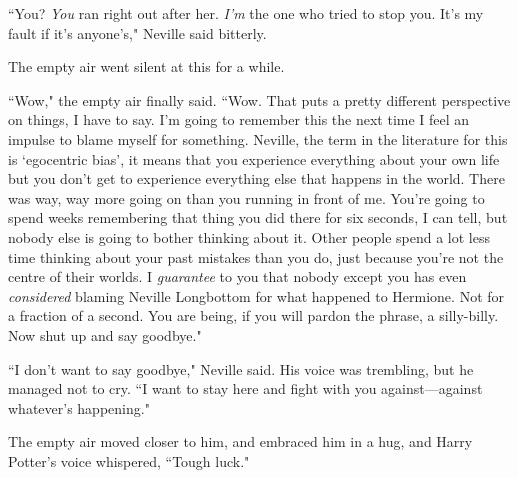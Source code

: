 ``You? \emph{You} ran right out after her. \emph{I'm} the one who tried to stop you. It's my fault if it's anyone's," Neville said bitterly.

The empty air went silent at this for a while.

``Wow," the empty air finally said. ``Wow. That puts a pretty different perspective on things, I have to say. I'm going to remember this the next time I feel an impulse to blame myself for something. Neville, the term in the literature for this is `egocentric bias', it means that you experience everything about your own life but you don't get to experience everything else that happens in the world. There was way, way more going on than you running in front of me. You're going to spend weeks remembering that thing you did there for six seconds, I can tell, but nobody else is going to bother thinking about it. Other people spend a lot less time thinking about your past mistakes than you do, just because you're not the centre of their worlds. I \emph{guarantee} to you that nobody except you has even \emph{considered} blaming Neville Longbottom for what happened to Hermione. Not for a fraction of a second. You are being, if you will pardon the phrase, a silly-billy. Now shut up and say goodbye."

``I don't want to say goodbye," Neville said. His voice was trembling, but he managed not to cry. ``I want to stay here and fight with you against—against whatever's happening."

The empty air moved closer to him, and embraced him in a hug, and Harry Potter's voice whispered, ``Tough luck."

